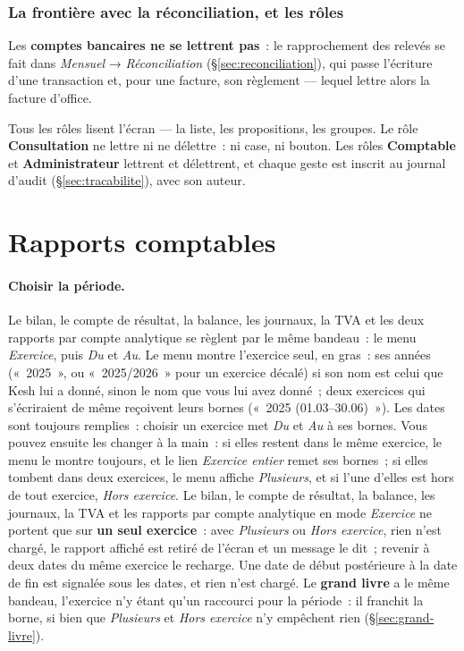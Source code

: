 \documentclass[a4paper,11pt,oneside]{article}
\begin{document}
\subsubsection{La frontière avec la réconciliation, et les rôles}\label{sec:lettrage-frontiere}

Les \textbf{comptes bancaires ne se lettrent pas}~: le rapprochement des relevés se fait dans
\emph{Mensuel} → \emph{Réconciliation} (\S\ref{sec:reconciliation}), qui passe l'écriture d'une
transaction et, pour une facture, son règlement --- lequel lettre alors la facture d'office.

Tous les rôles lisent l'écran --- la liste, les propositions, les groupes. Le rôle
\textbf{Consultation} ne lettre ni ne délettre~: ni case, ni bouton. Les rôles
\textbf{Comptable} et \textbf{Administrateur} lettrent et délettrent, et chaque geste est inscrit
au journal d'audit (\S\ref{sec:tracabilite}), avec son auteur.

\section{Rapports comptables}

\paragraph{Choisir la période.} Le bilan, le compte de résultat, la balance, les journaux, la TVA et les deux
rapports par compte analytique se règlent par le même bandeau~: le menu \emph{Exercice}, puis \emph{Du} et
\emph{Au}. Le menu montre l'exercice seul, en gras~: ses années («~2025~», ou «~2025/2026~» pour un exercice
décalé) si son nom est celui que Kesh lui a donné, sinon le nom que vous lui avez donné~; deux exercices qui
s'écriraient de même reçoivent leurs bornes («~2025 (01.03--30.06)~»). Les dates sont toujours remplies~:
choisir un exercice met \emph{Du} et \emph{Au} à ses bornes. Vous pouvez ensuite les changer à la main~: si
elles restent dans le même exercice, le menu le montre toujours, et le lien \emph{Exercice entier} remet ses
bornes~; si elles tombent dans deux exercices, le menu affiche \emph{Plusieurs}, et si l'une d'elles est hors de
tout exercice, \emph{Hors exercice}. Le bilan, le compte de résultat, la balance, les journaux, la TVA et les
rapports par compte analytique en mode \emph{Exercice} ne portent que sur \textbf{un seul exercice}~: avec
\emph{Plusieurs} ou \emph{Hors exercice}, rien n'est chargé, le rapport affiché est retiré de l'écran et un
message le dit~; revenir à deux dates du même exercice le recharge. Une date de début postérieure à la date de
fin est signalée sous les dates, et rien n'est chargé. Le \textbf{grand livre} a le même bandeau, l'exercice
n'y étant qu'un raccourci pour la période~: il franchit la borne, si bien que \emph{Plusieurs} et \emph{Hors
exercice} n'y empêchent rien (\S\ref{sec:grand-livre}).
\end{document}
